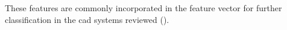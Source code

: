 \begin{enumerate}[leftmargin=*]
%
%
%

These features are commonly incorporated in the feature vector for further classification in the \ac{cad} systems reviewed (\cite{Niaf2011,Niaf2012,Tiwari2009a,Tiwari2010,Tiwari2013,Viswanath2008,Viswanath2011}).


\end{enumerate}
